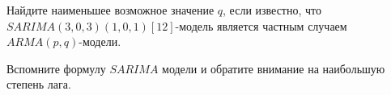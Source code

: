 
\begin{question}
Найдите наименьшее возможное значение \(q\), если известно, что \(SARIMA(3, 0, 3)(1, 0, 1)[12]\)-модель является частным случаем \(ARMA(p, q)\)-модели.
\end{question}

\begin{solution}
Вспомните формулу \(SARIMA\) модели и обратите внимание на наибольшую степень лага.
\end{solution}

